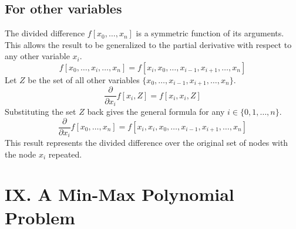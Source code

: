 \documentclass[a4paper]{article}
\begin{document}
\subsection*{For other variables}

The divided difference $f[x_0, \dots, x_n]$ is a symmetric function of its arguments. This allows the result to be generalized to the partial derivative with respect to any other variable $x_i$.
\[
f[x_0, \dots, x_i, \dots, x_n] = f[x_i, x_0, \dots, x_{i-1}, x_{i+1}, \dots, x_n]
\]
Let $Z$ be the set of all other variables $\{x_0, \dots, x_{i-1}, x_{i+1}, \dots, x_n\}$.
\[
\frac{\partial}{\partial x_i} f[x_i, Z] = f[x_i, x_i, Z]
\]
Substituting the set $Z$ back gives the general formula for any $i \in \{0, 1, \dots, n\}$.
\[
\frac{\partial}{\partial x_i} f[x_0, \dots, x_n] = f[x_i, x_i, x_0, \dots, x_{i-1}, x_{i+1}, \dots, x_n]
\]
This result represents the divided difference over the original set of nodes with the node $x_i$ repeated.


\section*{IX. A Min-Max Polynomial Problem}
\end{document}
